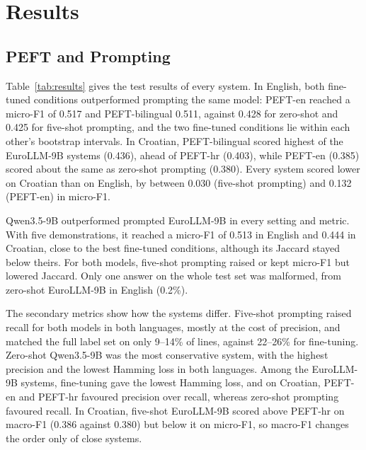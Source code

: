 \section{Results}
\label{sec:results}

\subsection{PEFT and Prompting}
\label{sec:results_main}

Table~\ref{tab:results} gives the test results of every system. In English, both fine-tuned conditions outperformed prompting the same model: PEFT-en reached a micro-F1 of 0.517 and PEFT-bilingual 0.511, against 0.428 for zero-shot and 0.425 for five-shot prompting, and the two fine-tuned conditions lie within each other's bootstrap intervals. In Croatian, PEFT-bilingual scored highest of the EuroLLM-9B systems (0.436), ahead of PEFT-hr (0.403), while PEFT-en (0.385) scored about the same as zero-shot prompting (0.380). Every system scored lower on Croatian than on English, by between 0.030 (five-shot prompting) and 0.132 (PEFT-en) in micro-F1.

Qwen3.5-9B outperformed prompted EuroLLM-9B in every setting and metric. With five demonstrations, it reached a micro-F1 of 0.513 in English and 0.444 in Croatian, close to the best fine-tuned conditions, although its Jaccard stayed below theirs. For both models, five-shot prompting raised or kept micro-F1 but lowered Jaccard. Only one answer on the whole test set was malformed, from zero-shot EuroLLM-9B in English (0.2\%).

The secondary metrics show how the systems differ. Five-shot prompting raised recall for both models in both languages, mostly at the cost of precision, and matched the full label set on only 9--14\% of lines, against 22--26\% for fine-tuning. Zero-shot Qwen3.5-9B was the most conservative system, with the highest precision and the lowest Hamming loss in both languages. Among the EuroLLM-9B systems, fine-tuning gave the lowest Hamming loss, and on Croatian, PEFT-en and PEFT-hr favoured precision over recall, whereas zero-shot prompting favoured recall. In Croatian, five-shot EuroLLM-9B scored above PEFT-hr on macro-F1 (0.386 against 0.380) but below it on micro-F1, so macro-F1 changes the order only of close systems.

